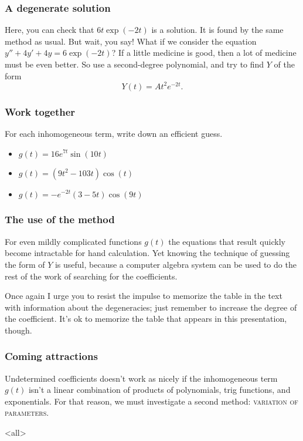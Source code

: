 \begin{frame}

\frametitle{A degenerate solution}
\label{adegeneratesolution}

Here, you can check that $ 6t \exp{(-2t)} $ is a solution. It is found by the same method as usual. But wait, you say!
 \pause 
What if we consider the equation $ y'' + 4y' + 4y = 6 \exp{(-2t)} $?
 \pause 
If a little medicine is good, then a lot of medicine must be even better. So use a second-degree polynomial, and try to find $ Y $ of the form
\[
    Y(t) = At^2 e^{-2t}.    
\]

\end{frame}

\begin{frame}
\frametitle{Work together}
For each inhomogeneous term, write down an efficient guess.

\begin{itemize}
\item $g(t) = 16 e^{7t} \sin{(10t)}$
\item $g(t) = (9t^2 - 103t) \cos{(t)}$
\item $g(t) = -e^{-2t} (3 - 5t) \cos{(9t)}$
\end{itemize}
\end{frame}

\begin{frame}

\frametitle{The use of the method}
\label{theuseofthemethod}

For even mildly complicated functions $ g(t) $ the equations that result quickly become intractable for hand calculation. Yet knowing the technique of guessing the form of $ Y $ is useful, because a computer algebra system can be used to do the rest of the work of searching for the coefficients.

Once again I urge you to resist the impulse to memorize the table in the text with information about the degeneracies; just remember to increase the degree of the coefficient. It's ok to memorize the table that appears in this presentation, though.

\end{frame}

\begin{frame}

\frametitle{Coming attractions}
\label{comingattractions}

Undetermined coefficients doesn't work as nicely if the inhomogeneous term $ g(t) $ isn't a linear combination of products of polynomials, trig functions, and exponentials. For that reason, we must investigate a second method: \textsc{variation of parameters.}

\end{frame}

\mode<all>


\mode*

